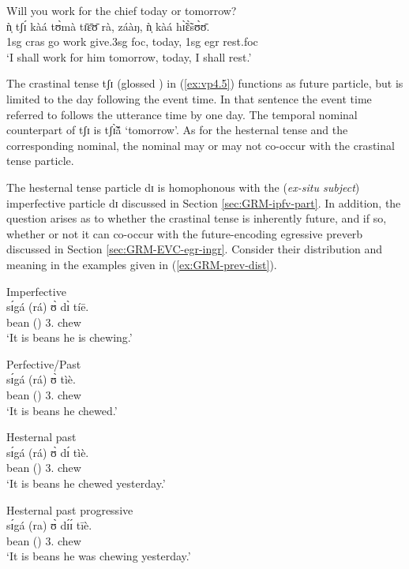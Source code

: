 \begin{exe}
\begin{exe}
\begin{exe}
\begin{exe}
\begin{exe}
\begin{exe}
\begin{exe}
\begin{exe}
\begin{exe}
\begin{exe}
\begin{exe}
\begin{exe}
\ea\label{ex:vp4.5} {\rm Will you work for the chief today or tomorrow?}\\
\gll  ǹ̩ tʃɪ́ kàá tʊ̀mà tɪ̄ɛ̄ʊ̄ rà, záàŋ,  ǹ̩ kàá hɪ̃̀ɛ̃̀sʊ̀ʊ̄.\\
 {\sc 1sg} {\sc cras}  go  work give.{\sc 3sg} {\sc foc},
today,   {\sc 1sg}  {\sc egr} rest.{\sc foc}\\
\glt  `I shall work for
him tomorrow, today,  I shall rest.' 
 \z

The crastinal tense  {\sls tʃɪ} (glossed {\cras})  in  (\ref{ex:vp4.5}) functions as future particle,  but is limited to the day following the event time. In that sentence the event time referred to follows  the utterance time by one day.  The temporal nominal counterpart  of {\sls tʃɪ} is {\sls  tʃɪ̃̀ã́} `tomorrow'. As for the hesternal tense and the corresponding nominal,  the  nominal may or may not co-occur with the crastinal tense particle. 

The hesternal tense particle {\sls dɪ} is homophonous with the ({\it ex-situ
subject}) imperfective particle  {\sls dɪ} discussed in Section
\ref{sec:GRM-ipfv-part}.  In addition, the question arises as to whether the
crastinal tense  is inherently future, and if so, whether or not it can
co-occur with the future-encoding egressive preverb discussed in Section
\ref{sec:GRM-EVC-egr-ingr}. Consider their distribution and meaning in the
examples given in (\ref{ex:GRM-prev-dist}).


\ea\label{ex:GRM-prev-dist}

\ea\label{ex:GRM-prev-dist-chew-presprog}{\rm Imperfective}\\
\gll  sɪ́gá (rá)  ʊ̀ dɪ̀  tíē.\\
 bean  ({\foc}) {3.\sg} {\ipfv} chew\\
\glt `It is {\sc beans} he is chewing.'

 \ex\label{ex:GRM-prev-dist-chew-past}{\rm Perfective/Past}\\
\gll  sɪ́gá (rá) ʊ̀   tìè.\\
 bean  ({\foc}) {3.\sg}  chew\\
\glt `It is {\sc beans} he chewed.'


 \ex\label{ex:GRM-prev-dist-chew-past-hest}{\rm Hesternal past}\\
\gll  sɪ́gá (rá) ʊ̀ dɪ́ tìè.\\
 bean  ({\foc}) {3.\sg} {\hest}  chew\\
\glt `It is {\sc beans} he chewed yesterday.'


 \ex\label{ex:GRM-prev-dist-chew-past-pro}{\rm Hesternal past progressive}\\
\gll  sɪ́gá (ra) ʊ̀ dɪ́ɪ́ tīè.\\
 bean  ({\foc}) {3.\sg} {\hest}  chew\\
\glt `It is {\sc beans} he was chewing yesterday.'


\end{exe}
\end{exe}
\end{exe}
\end{exe}
\end{exe}
\end{exe}
\end{exe}
\end{exe}
\end{exe}
\end{exe}
\end{exe}
\end{exe}
